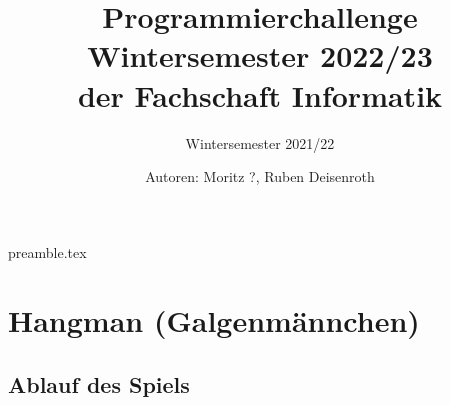 \RequirePackage{import}
{preamble.tex}

\usepackage{hyperref}
\usepackage{fancyvrb}

\usepackage{csquotes}
\usepackage{tikz}
\usetikzlibrary{fit,backgrounds}


\usepackage[font=normalsize, labelfont=sf, position=bottom]{caption}
\usepackage[labelfont=normalfont, position=bottom]{subcaption}

\setlength{\parindent}{0pt}

\def\gamefont{\bfseries\sffamily}




\title{Programmierchallenge Wintersemester 2022/23 \\ {\small der Fachschaft Informatik}}
\subtitle{Wintersemester 2021/22}
\author{Autoren: Moritz ?, Ruben Deisenroth}
\maketitle

\section*{Hangman (Galgenmännchen) \hyperref[footnote:1]{\footnotemark[1]}}
\subsection*{Ablauf des Spiels}

